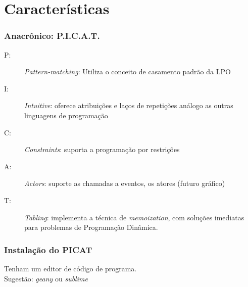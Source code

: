 \documentclass[10pt]{beamer}
\begin{document}
\section{Características}
\begin{frame}
    \frametitle{Anacrônico: \textbf{P.I.C.A.T.}}
 
 
 \begin{description}
   
 
 \item [P:] \textit{Pattern-matching}:  Utiliza o conceito de casamento padrão da LPO
 
 \item [I:]  \textit{Intuitive}: oferece atribuições e laços de repetições análogo as outras linguagens de programação
 
  \item [C:]   \textit{Constraints}: suporta a programação por restrições
 
     \item [A:] \textit{Actors}: suporte as chamadas a eventos, os atores (futuro gráfico) 
 
  \item [T:] \textit{Tabling}: implementa a técnica de \textit{memoization}, com soluções imediatas para problemas de Programação Dinâmica.
   
  
\end{description}
\end{frame}


\begin{frame}
    
\end{frame}


\begin{frame}
    \end{frame}



\begin{frame}
    \frametitle{Instalação do PICAT}

     Tenham um editor de código de programa.\\
     Sugestão: \textit{geany} ou \textit{sublime}



\end{frame}
\end{document}
